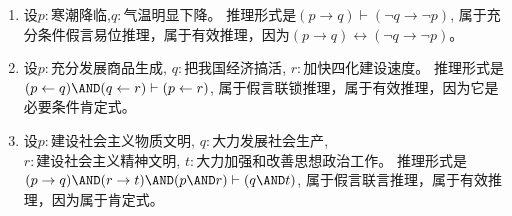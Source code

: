 \documentclass{ctexart}
\begin{document}
\begin{solution}
  \begin{enumerate}
    \item 设\(p:\text{寒潮降临}\),\(q:\text{气温明显下降}\)。
      推理形式是\((p \to q ) \vdash (\neg q \to \neg p)\), 属于充分条件假言易位推理，属于有效推理，因为\((p \to q) \leftrightarrow (\neg q \to \neg p)\)。
    \item 设\(p:\text{充分发展商品生成}\), \(q:\text{把我国经济搞活}\), \(r:\text{加快四化建设速度}\)。
      推理形式是\((p \leftarrow q) \AND (q \leftarrow r) \vdash (p \leftarrow r)\), 属于假言联锁推理，属于有效推理，因为它是必要条件肯定式。
    \item 设\(p:\text{建设社会主义物质文明}\), \(q:\text{大力发展社会生产}\),
      \\\(r:\text{建设社会主义精神文明}\), \(t:\text{大力加强和改善思想政治工作}\)。
      推理形式是\((p \to q) \AND (r \to t) \AND(p \AND r) \vdash (q \AND t)\), 属于假言联言推理，属于有效推理，因为属于肯定式。
  \end{enumerate}

\end{solution}
\end{document}
